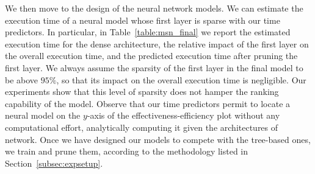 We then move to the design of the neural network models. We can estimate the execution time of a neural model whose first layer is sparse with our time predictors. In particular, in Table~\ref{table:msn_final} we report the estimated execution time for the dense architecture, the relative impact of the first layer on the overall execution time, and the predicted execution time after pruning the first layer.
We always assume the sparsity of the first layer in the final model to be above $95\%$, so that its impact on the overall execution time is negligible. Our experiments show that this level of sparsity does not hamper the ranking capability of the model.
Observe that our time predictors permit to locate a neural model on the $y$-axis of the effectiveness-efficiency plot without any computational effort, analytically computing it given the architectures of network. 
Once we have designed our models to compete with the tree-based ones, we train and prune them, according to the methodology listed in Section~\ref{subsec:expsetup}.
\begin{table}[b]
	\centering
	\caption{Prediction of model scoring time (Sc. Time) when pruning the first layer, in \emph{High Quality Retrieval}.  }
	\label{table:msn_final}
\end{table}

